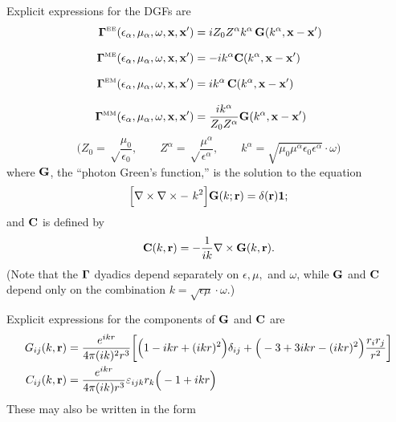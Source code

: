 \documentclass[letterpaper]{article}
\begin{document}
Explicit expressions for the DGFs are 
\begin{align*}
\boldsymbol{\Gamma}^{\hbox{\tiny{EE}}}(\epsilon_\alpha, \mu_\alpha, \omega, \mathbf{x}, \mathbf{x}^\prime)
&=
 iZ_0 Z^\alpha k^\alpha \, \mathbf{G}(k^\alpha, \mathbf{x}-\mathbf{x}^\prime)
\\[8pt]
\boldsymbol{\Gamma}^{\hbox{\tiny{ME}}}(\epsilon_\alpha, \mu_\alpha, \omega, \mathbf{x}, \mathbf{x}^\prime)
&=
 -ik^\alpha \mathbf{C}(k^\alpha, \mathbf{x}-\mathbf{x}^\prime)
\\[8pt]
\boldsymbol{\Gamma}^{\hbox{\tiny{EM}}}(\epsilon_\alpha, \mu_\alpha, \omega, \mathbf{x}, \mathbf{x}^\prime)
&=
 ik^\alpha \, \mathbf{C}(k^\alpha, \mathbf{x}-\mathbf{x}^\prime)
\\[8pt]
\boldsymbol{\Gamma}^{\hbox{\tiny{MM}}}(\epsilon_\alpha, \mu_\alpha, \omega, \mathbf{x}, \mathbf{x}^\prime)
&= \frac{ik^\alpha}{Z_0 Z^\alpha} \mathbf{G}(k^\alpha, \mathbf{x}-\mathbf{x}^\prime)
\end{align*}
$$\bigg(Z_0=\sqrt\frac{\mu_0}{\epsilon_0},
        \qquad
        Z^\alpha=\sqrt\frac{\mu^\alpha}{\epsilon^\alpha}, 
         \qquad
        k^\alpha=\sqrt{\mu_0 \mu^\alpha \epsilon_0 \epsilon^\alpha}\cdot \omega
  \bigg)
$$
where $\mathbf{G}$, the ``photon Green's function,''
is the solution to the equation
\begin{equation}
 \Big[\nabla \times \nabla\times - \,\,k^2 \Big]\mathbf{G}(k; \mathbf{r})
 =\delta(\mathbf{r})\mathbf{1};
 \label{DyadicGFG}
\end{equation}
and $\mathbf{C}$ is defined by  
\begin{equation}
  \mathbf{C}(k, \mathbf{r}) = -\frac{1}{ik} \nabla \times \mathbf{G}(k, \mathbf{r}).
 \label{DyadicGFC}
\end{equation}
%
(Note that the $\boldsymbol{\Gamma}$ dyadics depend separately on $\epsilon,\mu,$ 
and $\omega$, while $\mathbf{G}$ and $\mathbf{C}$ depend only on the 
combination $k=\sqrt{\epsilon\mu}\cdot \omega.$)

Explicit expressions for the components of $\mathbf{G}$ and $\mathbf{C}$ are 
\begin{align*}
G_{ij}(k,\mathbf{r}) 
 &= \frac{e^{ikr}}{4\pi (ik)^2 r^3}
    \bigg[ \Big(1-ikr + (ikr)^2 \Big)\delta_{ij}
          +\Big(-3 + 3ikr - (ikr)^2 \Big)\frac{r_i r_j}{r^2}
    \bigg]
\\
C_{ij}(k,\mathbf{r}) 
 &= \frac{e^{ikr}}{4\pi (ik) r^3} \varepsilon_{ijk} r_k 
    \Big(-1+ikr\Big)
\end{align*}
These may also be written in the form
\end{document}
